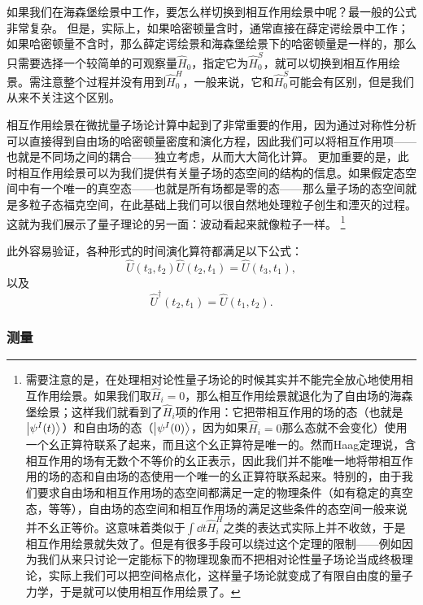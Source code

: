 \documentclass[UTF8, a4paper]{ctexart}
\begin{document}
如果我们在海森堡绘景中工作，要怎么样切换到相互作用绘景中呢？最一般的公式非常复杂。
但是，实际上，如果哈密顿量含时，通常直接在薛定谔绘景中工作；如果哈密顿量不含时，那么薛定谔绘景和海森堡绘景下的哈密顿量是一样的，那么只需要选择一个较简单的可观察量$\hat{H}_0$，指定它为$\hat{H}_0^S$，就可以切换到相互作用绘景。需注意整个过程并没有用到$\hat{H}_0^H$，一般来说，它和$\hat{H}_0^S$可能会有区别，但是我们从来不关注这个区别。

相互作用绘景在微扰量子场论计算中起到了非常重要的作用，因为通过对称性分析可以直接得到自由场的哈密顿量密度和演化方程，因此我们可以将相互作用项——也就是不同场之间的耦合——独立考虑，从而大大简化计算。
更加重要的是，此时相互作用绘景可以为我们提供有关量子场的态空间的结构的信息。如果假定态空间中有一个唯一的真空态——也就是所有场都是零的态——那么量子场的态空间就是多粒子态福克空间，在此基础上我们可以很自然地处理粒子创生和湮灭的过程。这就为我们展示了量子理论的另一面：波动看起来就像粒子一样。%
\footnote{需要注意的是，在处理相对论性量子场论的时候其实并不能完全放心地使用相互作用绘景。如果我们取$\hat{H}_i=0$，那么相互作用绘景就退化为了自由场的海森堡绘景；这样我们就看到了$\hat{H}_i$项的作用：它把带相互作用的场的态（也就是$\ket{\psi^I(t)}$）和自由场的态（$\ket{\psi^I(0)}$，因为如果$\hat{H}_i=0$那么态就不会变化）使用一个幺正算符联系了起来，而且这个幺正算符是唯一的。然而Haag定理说，含相互作用的场有无数个不等价的幺正表示，因此我们并不能唯一地将带相互作用的场的态和自由场的态使用一个唯一的幺正算符联系起来。特别的，由于我们要求自由场和相互作用场的态空间都满足一定的物理条件（如有稳定的真空态，等等），自由场的态空间和相互作用场的满足这些条件的态空间一般来说并不幺正等价。这意味着类似于$\int \dd{t} \hat{H}^H_i$之类的表达式实际上并不收敛，于是相互作用绘景就失效了。但是有很多手段可以绕过这个定理的限制——例如因为我们从来只讨论一定能标下的物理现象而不把相对论性量子场论当成终极理论，实际上我们可以把空间格点化，这样量子场论就变成了有限自由度的量子力学，于是就可以使用相互作用绘景了。}

此外容易验证，各种形式的时间演化算符都满足以下公式：
\begin{equation}
    \hat{U}(t_3,t_2) \hat{U}(t_2,t_1) = \hat{U}(t_3,t_1),
\end{equation}
以及
\begin{equation}
    \hat{U}^\dagger (t_2, t_1) = \hat{U} (t_1, t_2).
\end{equation}

\subsubsection{测量}\label{sec:measure}
\end{document}
